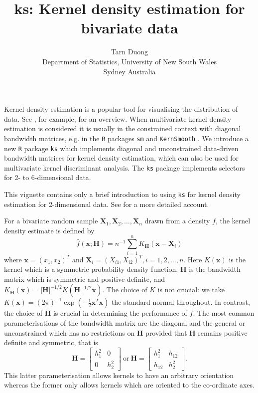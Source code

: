 \documentclass[a4paper,11pt]{article}
\title{ks: Kernel density estimation for bivariate data}
\author{Tarn Duong \\Department of Statistics, University of New South Wales\\ Sydney Australia}
\renewcommand{\vec}[1]{\boldsymbol{#1}}
\newcommand{\mat}[1]{\mathbf{#1}}
\def\Hmat{\mat{H}}
\def\vecx{\vec{x}}
\def\vecX{\vec{X}}
\let\proglang=\texttt
\let\pkg=\texttt
\begin{document}
\maketitle


Kernel density estimation is a popular tool for visualising 
the distribution of data. See \citet*{simonoff1996}, for example, for
an overview.
When multivariate kernel density estimation is considered it is usually
in the constrained context with diagonal bandwidth matrices, e.g. 
in the \proglang{R} packages \pkg{sm} \citep*{sm} and \pkg{KernSmooth} 
\citep*{KernSmooth}.  
We introduce a new \proglang{R} package \pkg{ks} 
which implements diagonal and unconstrained data-driven bandwidth matrices
for kernel density estimation,
which can also be used for multivariate kernel
discriminant analysis.  
The \pkg{ks} package implements selectors for  2- to 6-dimensional
data. 

This vignette contains only a brief introduction 
to using \pkg{ks} for kernel density estimation
for 2-dimensional data. 
See \citet*{duong2007c} for a more detailed account. 


For a bivariate random sample $\vecX_1, \vecX_2, \ldots, \vecX_n$ 
drawn from a density $f$, 
the kernel density estimate is defined by
$$
\hat{f} (\vecx; \Hmat) = n^{-1}\sum_{i=1}^n K_{\Hmat} ( \vecx - \vec{X}_i)
$$
where $\vecx = (x_1, x_2)^T$ and $\vec{X}_i = (X_{i1}, X_{i2})^T, i = 1, 2,  
\ldots, n$.  Here 
$K(\vecx)$ is the kernel which is a symmetric probability density function, 
$\Hmat$ 
is the bandwidth matrix which is symmetric and positive-definite,  
and $K_{\Hmat}(\vecx) = |\Hmat|^{-1/2} 
K( \Hmat^{-1/2} \vecx)$. 
The choice of $K$ is not crucial: we take 
$K(\vecx) = (2\pi)^{-1} \exp(-\tfrac{1}{2} \vecx^T \vecx)$ the standard normal
throughout.  
In contrast, the choice of $\Hmat$ is crucial in determining 
the performance of $\hat f$. 
The most common parameterisations of the bandwidth matrix
are the diagonal and the 
general or unconstrained which has no restrictions on $\Hmat$
provided that $\Hmat$
remains positive definite and symmetric, that is 
$$
\Hmat = \begin{bmatrix}h_1^2 & 0 \\0 & h_2^2 \end{bmatrix}
\ \mathrm{or} \ 
\Hmat = \begin{bmatrix}h_1^2 & h_{12} \\ h_{12}  & h_2^2 \end{bmatrix}.
$$
This latter
parameterisation allows kernels to have an arbitrary orientation
whereas the former only allows kernels which are oriented to the
co-ordinate axes.
\end{document}
